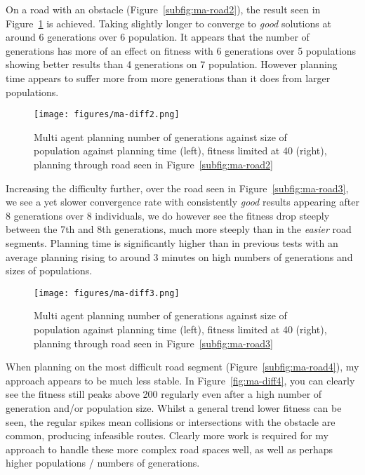 On a road with an obstacle (Figure~\ref{subfig:ma-road2}), the result seen in Figure~\ref{fig:ma-diff2-lim40} is achieved. Taking slightly longer to converge to \textit{good} solutions at around 6 generations over 6 population. It appears that the number of generations has more of an effect on fitness with 6 generations over 5 populations showing better results than 4 generations on 7 population. However planning time appears to suffer more from more generations than it does from larger populations.

\begin{figure}[ht]
  \centering
  \texttt{[image: figures/ma-diff2.png]}
  \caption{\label{fig:ma-diff2-lim40} Multi agent planning number of generations against size of population against planning time (left), fitness limited at 40 (right), planning through road seen in Figure~\ref{subfig:ma-road2}}
\end{figure}


Increasing the difficulty further, over the road seen in Figure~\ref{subfig:ma-road3}, we see a yet slower convergence rate with consistently \textit{good} results appearing after 8 generations over 8 individuals, we do however see the fitness drop steeply between the 7th and 8th generations, much more steeply than in the \textit{easier} road segments. Planning time is significantly higher than in previous tests with an average planning rising to around 3 minutes on high numbers of generations and sizes of populations.

\begin{figure}[ht]
  \centering
  \texttt{[image: figures/ma-diff3.png]}
  \caption{\label{fig:ma-diff3-lim40} Multi agent planning number of generations against size of population against planning time (left), fitness limited at 40 (right), planning through road seen in Figure~\ref{subfig:ma-road3}}
\end{figure}


When planning on the most difficult road segment (Figure~\ref{subfig:ma-road4}), my approach appears to be much less stable. In Figure~\ref{fig:ma-diff4}, you can clearly see the fitness still peaks above 200 regularly even after a high number of generation and/or population size. Whilst a general trend lower fitness can be seen, the regular spikes mean collisions or intersections with the obstacle are common, producing infeasible routes. Clearly more work is required for my approach to handle these more complex road spaces well, as well as perhaps higher populations / numbers of generations.

